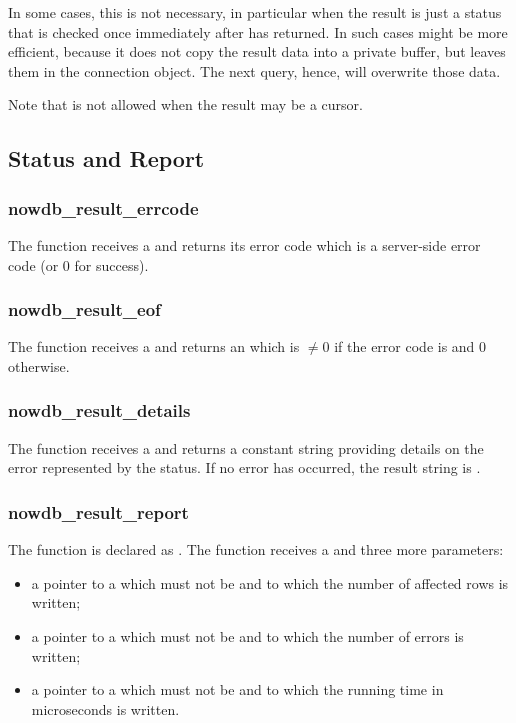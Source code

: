 In some cases, this is not necessary,
in particular when the result is just
a status that is checked once immediately
after  has returned.
In such cases
might be more efficient, because
it does not copy the result data into a private buffer,
but leaves them in the connection object.
The next query, hence, will overwrite
those data.

Note that 
is not allowed when the result
may be a cursor.

\subsection{Status and Report}
\subsubsection{nowdb\_result\_errcode}
The function receives a 
and returns its error code which is a server-side
error code (or 0 for success).

\subsubsection{nowdb\_result\_eof}
The function receives a 
and returns an  which is $\neq 0$
if the error code is 
and 0 otherwise.

\subsubsection{nowdb\_result\_details}
The function receives a 
and returns a constant string providing details
on the error represented by the status.
If no error has occurred, the result string
is .

\subsubsection{nowdb\_result\_report}
The function is declared as .
The function receives a 
and three more parameters:
\begin{itemize}
\item a pointer to a 
which must not be 
and to which the number of affected rows
is written; 
\item a pointer to a 
which must not be 
and to which the number of errors
is written; 
\item a pointer to a 
which must not be 
and to which the running time in microseconds
is written.
\end{itemize}

